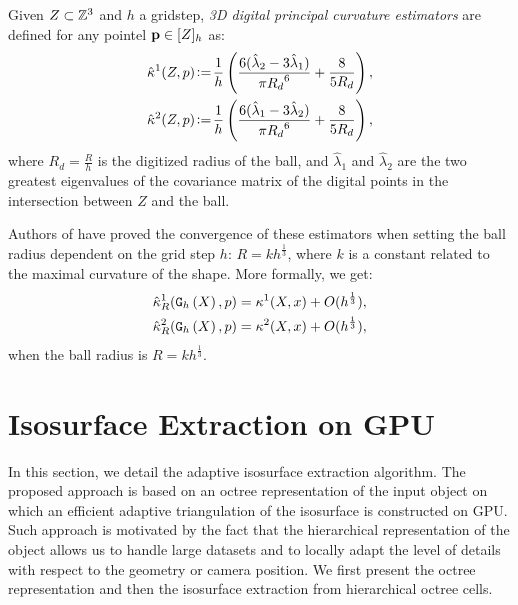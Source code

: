 \documentclass{llncs}
\begin{document}
\begin{Definition}
  Given $Z \subset {\mathbb{Z}}^3$ and
  $h$ a gridstep, {\em 3D digital principal curvature estimators} are defined for any pointel
  $\mathbf{p} \in \lbrack Z \rbrack_{h}$ as:
  \begin{align}
    \hat{\kappa}^{1}(Z,p) &\!\mathrel{\mathop:}=\! \frac{1}{h} \left( \frac{6(\hat{\lambda}_2 - 3\hat{\lambda}_1)}{\pi {{R_d}}^6} + \frac{8}{5{{R_d}}} \right),\label{eq:dig-curvature-estimator-k1}\\
    \hat{\kappa}^{2}(Z,p) &\!\mathrel{\mathop:}=\! \frac{1}{h} \left( \frac{6(\hat{\lambda}_1 - 3\hat{\lambda}_2)}{\pi {{R_d}}^6} + \frac{8}{5{{R_d}}} \right),
    \label{eq:dig-curvature-estimator-k2}
  \end{align}
  where $R_d = \frac{R}{h}$ is the digitized radius of the ball, and
  $\hat{\lambda}_1$ and $\hat{\lambda}_2$ are the two greatest eigenvalues of the covariance matrix of the digital points in the intersection between $Z$ and the ball.
\end{Definition}

Authors of \cite{CVIU2014} have proved the convergence of these
estimators when setting the ball radius dependent on the
grid step $h$: $R = kh^\frac{1}{3}$, where $k$ is a constant related
to the maximal curvature of the shape. More formally, we get:
\begin{align}
  \hat{\kappa}^1_{R}(\mathtt{G}_{h}\left(X\right),p) &= \kappa^1(X,x) + O(h^{\frac{1}{3}}),\\
  \hat{\kappa}^2_{R}(\mathtt{G}_{h}\left(X\right),p) &= \kappa^2(X,x) + O(h^{\frac{1}{3}}),
\end{align}
when the ball radius is $R = kh^\frac{1}{3}$.

\section{Isosurface Extraction on GPU}
\label{sec:isos-extr-gpu}

In this section, we detail the adaptive isosurface extraction
algorithm. The proposed approach is based on an octree representation
of the input object on which an efficient adaptive triangulation
of the isosurface is constructed on GPU. Such approach is motivated by
the fact that the hierarchical representation of the object allows us
to handle large datasets and to locally adapt the level of details
with respect to the geometry or camera position. We first present the
octree representation and then the isosurface extraction from
hierarchical octree cells.
\end{document}
